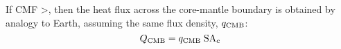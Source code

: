 \documentclass[10pt,a4paper]{article}
\begin{document}
If CMF \textgreater{}, then the heat flux across the core-mantle boundary is obtained by analogy to Earth, assuming the same flux density, $q_{\rm CMB}$:
\begin{equation}
Q_{\rm CMB} = q_{\rm CMB}\;{\rm SA}_c
\end{equation}



\end{document}
